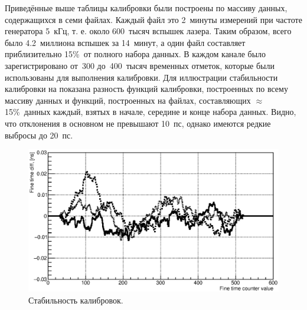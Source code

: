 Приведённые выше таблицы калибровки были построены по массиву данных, содержащихся в семи файлах. Каждый файл это 2~минуты измерений при частоте генератора 5~кГц, т. е. около 600~тысяч вспышек лазера. Таким образом, всего было 4.2~миллиона вспышек за  14~минут, а один файл составляет приблизительно 15\%~от полного набора данных. В каждом канале было зарегистрировано от~300 до~400~тысяч временных отметок, которые были использованы для выполнения калибровки. Для иллюстрации стабильности калибровки на  показана разность функций калибровки, построенных по всему массиву данных и функций, построенных на файлах, составляющих $ \approx $15\%~данных каждый, взятых в начале, середине и конце набора данных. Видно, что отклонения в основном не превышают 10~пс, однако имеются редкие выбросы до 20~пс.

\begin{figure}
\includegraphics[width=1.0\textwidth]{pictures/21_calibrationStability_dec2016.eps}
\caption{Стабильность калибровок.}
\label{fig:Stability}
\end{figure}
